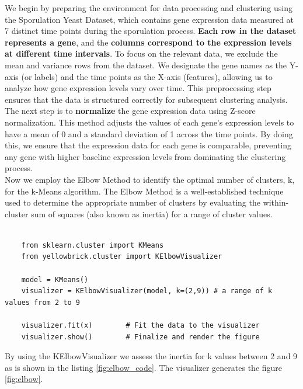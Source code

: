\documentclass{article}
\begin{document}
We begin by preparing the environment for data processing and clustering using the Sporulation Yeast Dataset, which contains gene expression data measured at 7 distinct time points during the sporulation process. \textbf{Each row in the dataset represents a gene}, and the \textbf{columns correspond to the expression levels at different time intervals}. To focus on the relevant data, we exclude the mean and variance rows from the dataset. We designate the gene names as the Y-axis (or labels) and the time points as the X-axis (features), allowing us to analyze how gene expression levels vary over time. This preprocessing step ensures that the data is structured correctly for subsequent clustering analysis.
\\

The next step is to \textbf{normalize} the gene expression data using Z-score normalization. This method adjusts the values of each gene's expression levels to have a mean of 0 and a standard deviation of 1 across the time points. By doing this, we ensure that the expression data for each gene is comparable, preventing any gene with higher baseline expression levels from dominating the clustering process. 
\\

Now we employ the Elbow Method to identify the optimal number of clusters, 
k, for the k-Means algorithm. The Elbow Method is a well-established technique used to determine the appropriate number of clusters by evaluating the within-cluster sum of squares (also known as inertia) for a range of cluster values. 
\\

\begin{lstlisting}[style=mypython, label=fig:elbow_code,caption=Implementation of Elbow Method to the dataset]
	 
	from sklearn.cluster import KMeans
	from yellowbrick.cluster import KElbowVisualizer
	
	model = KMeans()
	visualizer = KElbowVisualizer(model, k=(2,9)) # a range of k values from 2 to 9
	
	visualizer.fit(x)        # Fit the data to the visualizer
	visualizer.show()        # Finalize and render the figure	
\end{lstlisting}


By using the KElbowVisualizer  we assess the inertia for k values between 2 and 9 as is shown in the listing \ref{fig:elbow_code}.
The visualizer generates the figure \ref{fig:elbow}.
\end{document}
